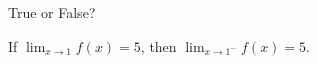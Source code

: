 \documentclass{ximera}
\author{Gregory Hartman \and Matthew Carr}
\begin{document}
\begin{exercise}



True or False?
\begin{center}
If $\lim_{x\to1}f(x)=5$, then $\lim_{x\to1^{-}}f(x)=5$.
\end{center}

\begin{prompt}
\begin{multipleChoice}
\end{multipleChoice}
\end{prompt}

\end{exercise}
\end{document}
